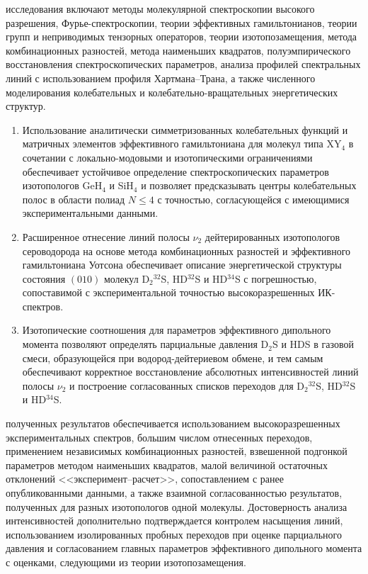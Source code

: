 {\methods} исследования включают методы молекулярной спектроскопии высокого разрешения,
Фурье-спектроскопии, теории эффективных гамильтонианов, теории групп и неприводимых тензорных
операторов, теории изотопозамещения, метода комбинационных разностей, метода наименьших квадратов,
полуэмпирического восстановления спектроскопических параметров, анализа профилей спектральных линий
с использованием профиля Хартмана--Трана, а также численного моделирования колебательных и
колебательно-вращательных энергетических структур.

{}
\begin{enumerate}[beginpenalty=10000]
  \item Использование аналитически симметризованных колебательных функций и матричных элементов
  эффективного гамильтониана для молекул типа XY$_4$ в сочетании с локально-модовыми и изотопическими
  ограничениями обеспечивает устойчивое определение спектроскопических параметров изотопологов GeH$_4$
  и SiH$_4$ и позволяет предсказывать центры колебательных полос в области полиад $N\leq4$ с точностью,
  согласующейся с имеющимися экспериментальными данными.
  \item Расширенное отнесение линий полосы $\nu_2$ дейтерированных изотопологов сероводорода на основе
  метода комбинационных разностей и эффективного гамильтониана Уотсона обеспечивает описание
  энергетической структуры состояния $(010)$ молекул D$_2{}^{32}$S, HD$^{32}$S и HD$^{34}$S с
  погрешностью, сопоставимой с экспериментальной точностью высокоразрешенных ИК-спектров.
  \item Изотопические соотношения для параметров эффективного дипольного момента позволяют определять
  парциальные давления D$_2$S и HDS в газовой смеси, образующейся при водород-дейтериевом обмене, и тем
  самым обеспечивают корректное восстановление абсолютных интенсивностей линий полосы $\nu_2$ и
  построение согласованных списков переходов для D$_2{}^{32}$S, HD$^{32}$S и HD$^{34}$S.
\end{enumerate}

{\reliability} полученных результатов обеспечивается использованием высокоразрешенных экспериментальных
спектров, большим числом отнесенных переходов, применением независимых комбинационных разностей,
взвешенной подгонкой параметров методом наименьших квадратов, малой величиной остаточных отклонений
<<эксперимент--расчет>>, сопоставлением с ранее опубликованными данными, а также взаимной
согласованностью результатов, полученных для разных изотопологов одной молекулы. Достоверность анализа
интенсивностей дополнительно подтверждается контролем насыщения линий, использованием изолированных
пробных переходов при оценке парциального давления и согласованием главных параметров эффективного
дипольного момента с оценками, следующими из теории изотопозамещения.

